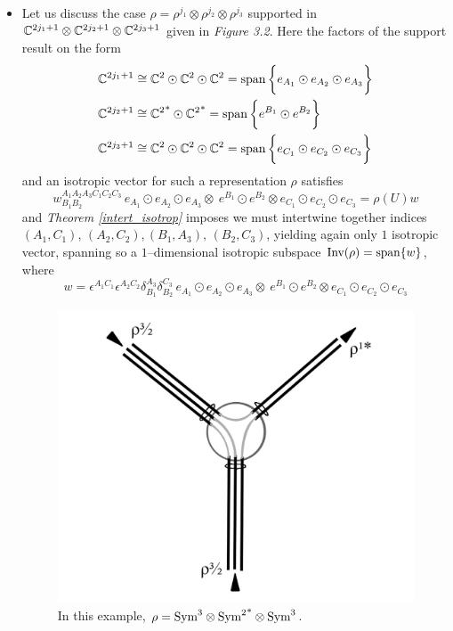 \begin{example}
\begin{itemize}
        \item Let us discuss the case $\rho=\rho^{j_1}\otimes\rho^{j_2}\otimes\rho^{j_3}$ supported in $\mathbb{C}^{2j_1+1}\otimes\mathbb{C}^{2j_2+1}\otimes\mathbb{C}^{2j_3+1}$ given in \emph{Figure 3.2}. Here the factors of the support result on the form
        \begin{align*}
            \mathbb{C}^{2j_1+1}&\cong\mathbb{C}^2\odot\mathbb{C}^2\odot\mathbb{C}^2=\operatorname{span}\bigg\{e_{A_1}\odot e_{A_2}\odot e_{A_3}\bigg\}\\
            \mathbb{C}^{2j_2+1}&\cong{\mathbb{C}^2}^*\odot{\mathbb{C}^2}^*=\operatorname{span}\bigg\{e^{B_1}\odot e^{B_2}\bigg\}\\
            \mathbb{C}^{2j_3+1}&\cong\mathbb{C}^2\odot\mathbb{C}^2\odot\mathbb{C}^2=\operatorname{span}\bigg\{e_{C_1}\odot e_{C_2}\odot e_{C_3}\bigg\}
        \end{align*}
      and an isotropic vector for such a representation $\rho$ satisfies
      $$w_{B_1B_2}^{A_1A_2A_3C_1C_2C_3}\,e_{A_1}\odot e_{A_2}\odot e_{A_3}\otimes\ e^{B_1}\odot e^{B_2}\otimes e_{C_1}\odot e_{C_2}\odot e_{C_3}=\rho(U)w$$
      and \emph{Theorem \ref{intert_isotrop}} imposes we must intertwine together indices $(A_1,C_1)$, $(A_2,C_2)$,$\,(B_1,A_3),\, (B_2,C_3)$, yielding again only $1$ isotropic vector, spanning so a $1$--dimensional isotropic subspace $\text{\normalfont Inv}(\rho)=\operatorname{span}\{w\}$, where
      $$w=\epsilon^{A_1C_1}\epsilon^{A_2C_2}\delta_{B_1}^{A_3}\delta_{B_2}^{C_3}\,e_{A_1}\odot e_{A_2}\odot e_{A_3}\otimes\ e^{B_1}\odot e^{B_2}\otimes e_{C_1}\odot e_{C_2}\odot e_{C_3}$$

      \begin{figure}[ht]
            \centering
            \includegraphics[scale=0.20]{images/intert_j1_j2_j3.jpeg}
            \caption{In this example, $\rho=\text{\normalfont Sym}^3\otimes{\text{\normalfont Sym}^2}^*\otimes\text{\normalfont Sym}^3$.}
        \end{figure}


\end{itemize}
\end{example}
